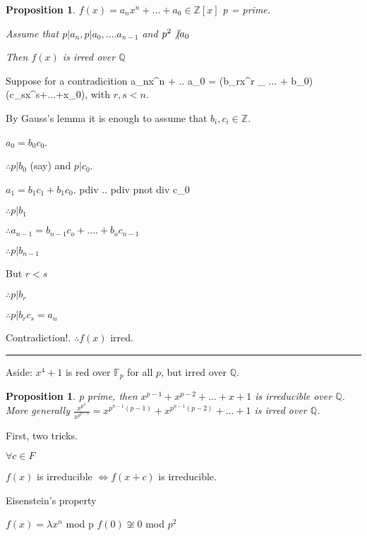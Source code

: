 \documentclass[twoside]{article}
\newcommand{\Z}{\mathbb{Z}}
\newcommand{\Q}{\mathbb{Q}}
\newtheorem{proposition}[theorem]{Proposition}
\newenvironment{proof}{{\bf Proof:}}{\hfill\rule{2mm}{2mm}}
\begin{document}
    
    \begin{proposition}
        $f(x) = a_nx^n + ... + a_0 \in \Z[x]$
        p = prime.

        Assume that $p \vert a_n, p \vert a_0,....a_{n-1}$
        and $p^2 \not\vert a_0$

        Then $f(x)$ is irred over $\Q$
    \end{proposition}
    
    \begin{proof}
        Suppose for a contradicition a_nx^n + .. a_0 = (b_rx^r _ ... + b_0)(c_sx^s+...+x_0), with $r,s < n$.

        By Gauss's lemma it is enough to assume that $b_i, c_i \in \Z$.

        $a_0 = b_0c_0$. 

        $\therefore p \vert b_0$ (say) and $p \vert c_0$.

        $a_1 = b_1c_1 + b_1c_0$.
        pdiv .. pdiv    pnot div c_0 

        $\therefore p \vert b_1$

        $\therefore a_{n-1} = b_{n-1}c_o + .... + b_oc_{n-1}$

        $\therefore p \vert b_{n-1}$

        But $r < s$

        $\therefore p \vert b_r$

        $\therefore p \vert b_rc_s = a_n$

        Contradiction!. $\therefore f(x) $ irred. 
    \end{proof}

    \newcommand{\F}{\mathbb{F}}

    Aside: $x^4+1$ is red over $\F_p$ for all $p$, but irred over $\Q$.

    \begin{proposition}
        p prime, then $x^{p-1} + x^{p-2}+ ... + x + 1$ is irreducible over $\Q$. 
        More generally $\frac{x^{p^n}}{x^{p^{n-1}}} = x^{p^{n-1}(p-1)} + x^{p^{n-1}(p-2)} + ... + 1$ is irred over $\Q$. 
    \end{proposition}

    First, two tricks. 

    $\forall c \in F$

    $f(x)$ is irreducible $\iff f(x+c)$ is irreducible. 

    Eisenstein's property

    $f(x) = \lambda x^n$ mod p
    $f(0) \not\cong 0$ mod $p^2$
\end{document}
